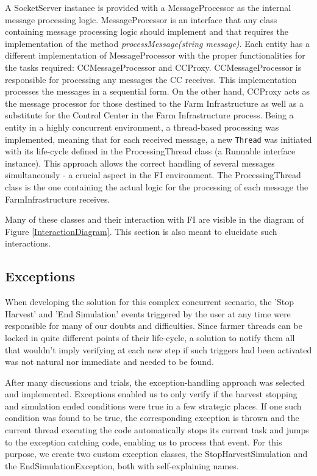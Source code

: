 \documentclass[12pt]{article}
\begin{document}
A SocketServer instance is provided with a MessageProcessor as the internal message processing logic.
MessageProcessor is an interface that any class containing message processing logic should implement and that requires the implementation of the method 
\textit{processMessage(string message)}. 
Each entity has a different implementation of MessageProcessor with the proper functionalities for the tasks required: CCMessageProcessor and CCProxy.
CCMessageProcessor is responsible for processing any messages the CC receives. 
This implementation processes the messages in a sequential form.
On the other hand, CCProxy acts as the message processor for those destined to the Farm Infrastructure as well as a substitute for the Control Center in the 
Farm Infrastructure process. 
Being a entity in a highly concurrent environment, a thread-based processing was implemented, meaning that for each received message, a new \texttt{Thread} was 
initiated with its life-cycle defined in the ProcessingThread class (a Runnable interface instance). 
This approach allows the correct handling of several messages simultaneously - a crucial aspect in the FI environment. 
The ProcessingThread class is the one containing the actual logic for the processing of each message the FarmInfrastructure receives.

Many of these classes and their interaction with FI are visible in the diagram of Figure \ref{InteractionDiagram}.
This section is also meant to elucidate such interactions.

\subsection{Exceptions} %

When developing the solution for this complex concurrent scenario, the 'Stop Harvest' and 'End Simulation' events triggered by the user at any time were 
responsible for many of our doubts and difficulties.
Since farmer threads can be locked in quite different points of their life-cycle, a solution to notify them all that wouldn't imply verifying at each new step 
if such triggers had been activated was not natural nor immediate and needed to be found.

After many discussions and trials, the exception-handling approach was selected and implemented. 
Exceptions enabled us to only verify if the harvest stopping and simulation ended conditions were true in a few strategic places.
If one such condition was found to be true, the corresponding exception is thrown and the current thread executing the code automatically stops its current task 
and jumps to the exception catching code, enabling us to process that event. 
For this purpose, we create two custom exception classes, the StopHarvestSimulation and the EndSimulationException, both with self-explaining names.
\end{document}
